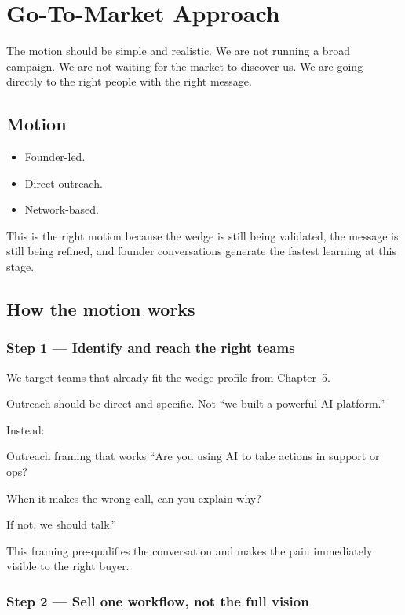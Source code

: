 \chapter{Go-To-Market Approach}

The motion should be simple and realistic.
We are not running a broad campaign.
We are not waiting for the market to discover us.
We are going directly to the right people with the right message.

\section{Motion}

\begin{itemize}
  \item Founder-led.
  \item Direct outreach.
  \item Network-based.
\end{itemize}

This is the right motion because the wedge is still being validated, the message is still being refined, and founder conversations generate the fastest learning at this stage.

\section{How the motion works}

\subsection{Step 1 --- Identify and reach the right teams}

We target teams that already fit the wedge profile from Chapter~5.

Outreach should be direct and specific.
Not ``we built a powerful AI platform.''

Instead:

\begin{insightbox}{Outreach framing that works}
``Are you using AI to take actions in support or ops?

When it makes the wrong call, can you explain why?

If not, we should talk.''
\end{insightbox}

This framing pre-qualifies the conversation and makes the pain immediately visible to the right buyer.

\subsection{Step 2 --- Sell one workflow, not the full vision}

